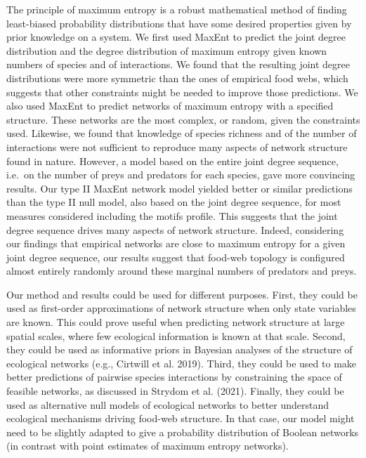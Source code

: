 \documentclass[10pt,oneside]{article}
\begin{document}
The principle of maximum entropy is a robust mathematical method of
finding least-biased probability distributions that have some desired
properties given by prior knowledge on a system. We first used MaxEnt to
predict the joint degree distribution and the degree distribution of
maximum entropy given known numbers of species and of interactions. We
found that the resulting joint degree distributions were more symmetric
than the ones of empirical food webs, which suggests that other
constraints might be needed to improve those predictions. We also used
MaxEnt to predict networks of maximum entropy with a specified
structure. These networks are the most complex, or random, given the
constraints used. Likewise, we found that knowledge of species richness
and of the number of interactions were not sufficient to reproduce many
aspects of network structure found in nature. However, a model based on
the entire joint degree sequence, i.e.~on the number of preys and
predators for each species, gave more convincing results. Our type II
MaxEnt network model yielded better or similar predictions than the type
II null model, also based on the joint degree sequence, for most
measures considered including the motifs profile. This suggests that the
joint degree sequence drives many aspects of network structure. Indeed,
considering our findings that empirical networks are close to maximum
entropy for a given joint degree sequence, our results suggest that
food-web topology is configured almost entirely randomly around these
marginal numbers of predators and preys.

Our method and results could be used for different purposes. First, they
could be used as first-order approximations of network structure when
only state variables are known. This could prove useful when predicting
network structure at large spatial scales, where few ecological
information is known at that scale. Second, they could be used as
informative priors in Bayesian analyses of the structure of ecological
networks (e.g., Cirtwill et al. 2019). Third, they could be used to make
better predictions of pairwise species interactions by constraining the
space of feasible networks, as discussed in Strydom et al. (2021).
Finally, they could be used as alternative null models of ecological
networks to better understand ecological mechanisms driving food-web
structure. In that case, our model might need to be slightly adapted to
give a probability distribution of Boolean networks (in contrast with
point estimates of maximum entropy networks).
\end{document}
